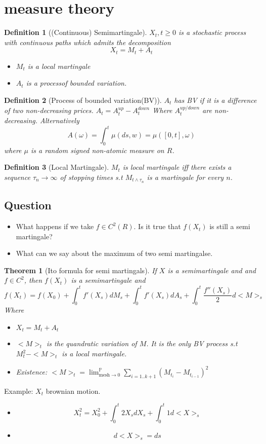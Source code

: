 \documentclass{article}
\newtheorem{theorem}{Theorem}
\newtheorem{definition}{Definition}
\begin{document}
\section{measure theory}
  
\begin{definition}[(Continuous) Semimartingale]
  $X_t, t \ge 0$ is a stochastic process with continuous paths which admits the decomposition
  $$X_t = M_t + A_t$$
  \begin{itemize}
  \item $M_t$ is a local martingale
  \item $A_t$ is a processof bounded variation.
  \end{itemize}
\end{definition}
\begin{definition}[Process of bounded variation(BV)]
  $A_t$ has BV if it is a difference of two non-decreasing prices.
  $A_t = A_t^{up} - A_t^{down}$ Where $A_t^{up/down}$ are non-decreasing.
  Alternatively
  $$A(\omega) = \int_0^t \mu(ds, w) = \mu([0, t], \omega)$$
  where $\mu$ is a random signed non-atomic measure on $R$.
\end{definition}
\begin{definition}[Local Martingale]
  $M_t$ is local martingale iff there exists a sequence $\tau_n \rightarrow \infty$ of stopping times s.t $M_{t \wedge \tau_n}$ is a martingale for every $n$.
\end{definition}
\subsection{Question}
\begin{itemize}
\item What happens if we take $f \in C^2(R)$. Is it true that $f(X_t)$
  is still a semi martingale?
\item What can we say about the maximum of two semi martingalse.
\end{itemize}

\begin{theorem}[Ito formula for semi martingals]
  If $X$ is a semimartingale and and $f \in C^2$, then $f(X_t)$ is a semimartingale and
  $$f(X_t) = f(X_0) + \int_0^t f'(X_s) dM_s + \int_0^t f'(X_s)dA_s + \int_0^t \frac{f''(X_s)}2 d<M>_s$$
  Where
  \begin{itemize}
  \item $X_t = M_t + A_t$
  \item $<M>_t$ is the quandratic variation of $M$. It is the only BV process s.t $M_t^2 - <M>_t$ is a local martingale.
  \item Existence: $<M>_t = \lim^{\mathbb{P}}_{\text{mesh} \rightarrow 0} \sum_{i=1..k+1} (M_{t_i} - M_{t_{i-1}})^2$
  \end{itemize}
\end{theorem}
Example: $X_t$ brownian motion.
\begin{itemize}
\item $$X_t^2 = X_0^2 + \int_0^t 2X_s dX_s + \int_0^t 1 d<X>_s$$
\item $$d<X>_s = ds$$
\end{itemize}
\end{document}
